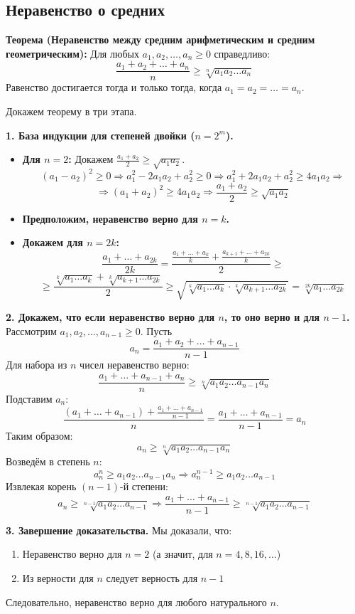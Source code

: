 \documentclass[12pt, paper]{article}
\begin{document}
\subsection{Неравенство о средних}
\begin{tcolorbox}
\textbf{Теорема (Неравенство между средним арифметическим и средним геометрическим):}
Для любых $a_1, a_2, \dots, a_n \geq 0$ справедливо:
$$\frac{a_1 + a_2 + \dots + a_n}{n} \geq \sqrt[n]{a_1 a_2 \dots a_n}$$
Равенство достигается тогда и только тогда, когда $a_1 = a_2 = \dots = a_n$.
\end{tcolorbox}

\begin{tcolorbox}[title=Доказательство по ММИ (метод Коши / метод обратой индукции), breakable]
Докажем теорему в три этапа.

\textbf{1. База индукции для степеней двойки ($n=2^m$).}
\begin{itemize}
    \item \textbf{Для $n=2$:} Докажем $\frac{a_1 + a_2}{2} \geq \sqrt{a_1 a_2}$.
    $$(a_1 - a_2)^2 \geq 0 \Rightarrow a_1^2 - 2a_1a_2 + a_2^2 \geq 0 \Rightarrow a_1^2 + 2a_1a_2 + a_2^2 \geq 4a_1a_2 \Rightarrow$$
    $$\Rightarrow (a_1 + a_2)^2 \geq 4a_1a_2 \Rightarrow \frac{a_1 + a_2}{2} \geq \sqrt{a_1 a_2}$$
    \item \textbf{Предположим, неравенство верно для $n = k$.}
    \item \textbf{Докажем для $n = 2k$:}
    $$\frac{a_1 + \dots + a_{2k}}{2k} = \frac{\frac{a_1 + \dots + a_k}{k} + \frac{a_{k+1} + \dots + a_{2k}}{k}}{2} \geq$$
    $$\geq \frac{\sqrt[k]{a_1 \dots a_k} + \sqrt[k]{a_{k+1} \dots a_{2k}}}{2} \geq \sqrt{\sqrt[k]{a_1 \dots a_k} \cdot \sqrt[k]{a_{k+1} \dots a_{2k}}} = \sqrt[2k]{a_1 \dots a_{2k}}$$
\end{itemize}

\textbf{2. Докажем, что если неравенство верно для $n$, то оно верно и для $n-1$.}
Рассмотрим $a_1, a_2, \dots, a_{n-1} \geq 0$. Пусть
$$a_n = \frac{a_1 + a_2 + \dots + a_{n-1}}{n-1}$$
Для набора из $n$ чисел неравенство верно:
$$\frac{a_1 + \dots + a_{n-1} + a_n}{n} \geq \sqrt[n]{a_1 a_2 \dots a_{n-1} a_n}$$
Подставим $a_n$:
$$\frac{(a_1 + \dots + a_{n-1}) + \frac{a_1 + \dots + a_{n-1}}{n-1}}{n} = \frac{a_1 + \dots + a_{n-1}}{n-1} = a_n$$
Таким образом:
$$a_n \geq \sqrt[n]{a_1 a_2 \dots a_{n-1} a_n}$$
Возведём в степень $n$:
$$a_n^n \geq a_1 a_2 \dots a_{n-1} a_n \Rightarrow a_n^{n-1} \geq a_1 a_2 \dots a_{n-1}$$
Извлекая корень $(n-1)$-й степени:
$$a_n \geq \sqrt[n-1]{a_1 a_2 \dots a_{n-1}} \Rightarrow \frac{a_1 + \dots + a_{n-1}}{n-1} \geq \sqrt[n-1]{a_1 a_2 \dots a_{n-1}}$$

\textbf{3. Завершение доказательства.}
Мы доказали, что:
\begin{enumerate}
    \item Неравенство верно для $n=2$ (а значит, для $n=4,8,16,\dots$)
    \item Из верности для $n$ следует верность для $n-1$
\end{enumerate}
Следовательно, неравенство верно для любого натурального $n$.
\end{tcolorbox}
\end{document}
